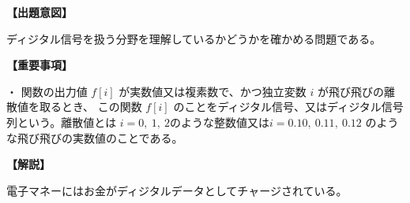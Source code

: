 \noindent \textbf{【出題意図】}

\noindent ディジタル信号を扱う分野を理解しているかどうかを確かめる問題である。

\vspace{1em}
\noindent \textbf{【重要事項】}

\medskip
\noindent ・ 関数の出力値 $f[i]$ が実数値又は複素数で、かつ独立変数 $i$ が飛び飛びの離散値を取るとき、 この関数 $f[i]$ のことをディジタル信号、又はディジタル信号列という。離散値とは $i=0,\ 1,\ 2$のような整数値又は$i=0.10,\ 0.11,\ 0.12$ のような飛び飛びの実数値のことである。

\vspace{1em}
\noindent \textbf{【解説】}

\noindent 電子マネーにはお金がディジタルデータとしてチャージされている。
